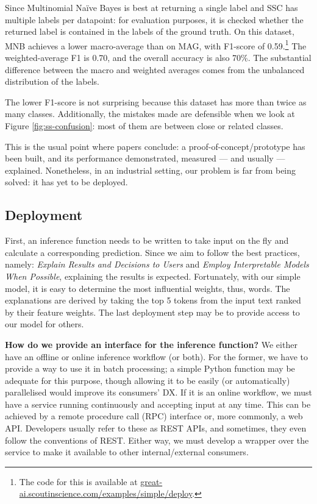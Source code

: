 Since Multinomial Naïve Bayes is best at returning a single label and SSC has multiple labels per datapoint: for evaluation purposes, it is checked whether the returned label is contained in the labels of the ground truth. On this dataset, MNB achieves a lower macro-average than on MAG, with F1-score of 0.59.\footnote{The code for this is available at \href{https://great-ai.scoutinscience.com/examples/simple/deploy}{great-ai.scoutinscience.com/examples/simple/deploy}.} The weighted-average F1 is 0.70, and the overall accuracy is also 70\%. The substantial difference between the macro and weighted averages comes from the unbalanced distribution of the labels.

The lower F1-score is not surprising because this dataset has more than twice as many classes. Additionally, the mistakes made are defensible when we look at Figure \ref{fig:ss-confusion}: most of them are between close or related classes.

\begin{displayquote}
This is the usual point where papers conclude: a proof-of-concept/prototype has been built, and its performance demonstrated, measured --- and usually --- explained. Nonetheless, in an industrial setting, our problem is far from being solved: it has yet to be deployed.
\end{displayquote}

\subsection{Deployment}

First, an inference function needs to be written to take input on the fly and calculate a corresponding prediction. Since we aim to follow the best practices, namely: \textit{Explain Results and Decisions to Users} and \textit{Employ Interpretable Models When Possible}, explaining the results is expected. Fortunately, with our simple model, it is easy to determine the most influential weights, thus, words. The explanations are derived by taking the top 5 tokens from the input text ranked by their feature weights. The last deployment step may be to provide access to our model for others.

\begin{displayquote}
\textbf{How do we provide an interface for the inference function?} We either have an offline or online inference workflow (or both). For the former, we have to provide a way to use it in batch processing; a simple Python function may be adequate for this purpose, though allowing it to be easily (or automatically) parallelised would improve its consumers' DX. If it is an online workflow, we must have a service running continuously and accepting input at any time. This can be achieved by a remote procedure call (RPC) interface or, more commonly, a web API. Developers usually refer to these as REST APIs, and sometimes, they even follow the conventions of REST. Either way, we must develop a wrapper over the service to make it available to other internal/external consumers.
\end{displayquote}

